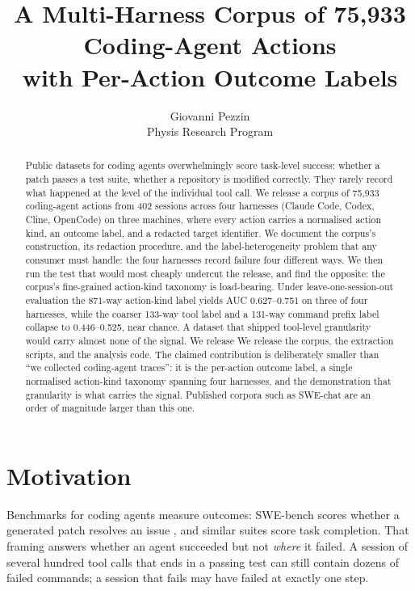 \documentclass[11pt]{article}
\title{A Multi-Harness Corpus of 75{,}933 Coding-Agent Actions\\
with Per-Action Outcome Labels}
\author{Giovanni Pezzin \\ Physis Research Program}
\date{}
\begin{document}
\maketitle

\begin{abstract}
Public datasets for coding agents overwhelmingly score task-level success:
whether a patch passes a test suite, whether a repository is modified
correctly. They rarely record what happened at the level of the individual
tool call. We release a corpus of 75,933 coding-agent actions from 402
sessions across four harnesses (Claude Code, Codex, Cline, OpenCode) on
three machines, where every action carries a normalised action kind, an
outcome label, and a redacted target identifier. We document the corpus's
construction, its redaction procedure, and the label-heterogeneity problem
that any consumer must handle: the four harnesses record failure four
different ways. We then run the test that would most cheaply undercut the
release, and find the opposite: the corpus's fine-grained action-kind
taxonomy is load-bearing. Under leave-one-session-out evaluation the
871-way action-kind label yields AUC 0.627--0.751 on three of four
harnesses, while the coarser 133-way tool label and a 131-way command
prefix label collapse to 0.446--0.525, near chance. A dataset that shipped
tool-level granularity would carry almost none of the signal. We release
We release the corpus, the extraction scripts, and the analysis code. The
claimed contribution is deliberately smaller than ``we collected coding-agent
traces'': it is the per-action outcome label, a single normalised action-kind
taxonomy spanning four harnesses, and the demonstration that granularity is
what carries the signal. Published corpora such as SWE-chat are an order of
magnitude larger than this one.
\end{abstract}

\section{Motivation}

Benchmarks for coding agents measure outcomes: SWE-bench scores whether a
generated patch resolves an issue \cite{jimenez2024swebench}, and similar
suites score task completion. That framing answers whether an agent
succeeded but not \emph{where} it failed. A session of several hundred
tool calls that ends in a passing test can still contain dozens of failed
commands; a session that fails may have failed at exactly one step.
\end{document}
